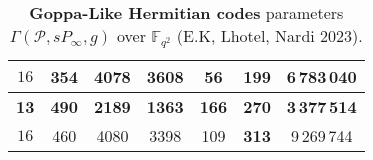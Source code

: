 \documentclass[
10pt, %
%
aspectratio=169, %
]{beamer}
\theoremstyle{plain}%
\theoremstyle{definition}
\theoremstyle{remark}
\newcommand{\calP}{\mathcal{P}}
\newcommand{\F}{\mathbb{F}}
\begin{document}
\begin{frame}
\begin{table}[h]
\begin{center}
{\begin{tabular}{|c|c|c|c|c|c|c|}
						\hline 
						${16}$&354& 4078& 3608& 56& \cellcolor{almond}\textbf{199}& 6\,783\,040   \\
						
						\hline \hline
						\rowcolor{almond}\textbf{13}& \textbf{490}& \textbf{2189}& \textbf{1363}& \textbf{166}& \textbf{270}& \textbf{3\,377\,514} \\
						
						\hline 
						${16}$& 460 &4080& 3398& 109& \cellcolor{almond}\textbf{313}& 9\,269\,744\\
						\hline
				\end{tabular}}
				\caption{\textbf{Goppa-Like Hermitian codes }parameters $\Gamma(\calP,sP_\infty,g)$ over $\F_{q^2}$ (E.K, Lhotel, Nardi 2023).} \label{table:goppa-herm}
			\end{center}
		\end{table}
		\vspace*{-0.8em}
	\end{frame}
\end{document}
